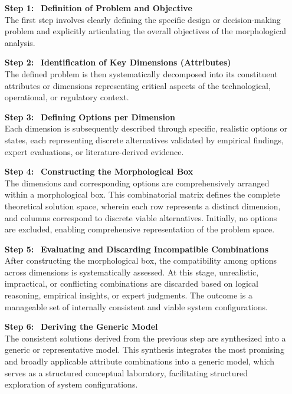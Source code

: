 \begin{enumerate}[itemsep=0.5\baselineskip]
    \item[\textbf{Step 1:}] ~\textbf{Definition of Problem and Objective}\\
    The first step involves clearly defining the specific design or decision-making problem and explicitly articulating the overall objectives of the morphological analysis. \autocite[12]{Ritchey.2011}

    \item[\textbf{Step 2:}] ~\textbf{Identification of Key Dimensions (Attributes)}\\
    The defined problem is then systematically decomposed into its constituent attributes or dimensions representing critical aspects of the technological, operational, or regulatory context. \autocite[12]{Ritchey.2011}

    \item[\textbf{Step 3:}] ~\textbf{Defining Options per Dimension}\\
    Each dimension is subsequently described through specific, realistic options or states, each representing discrete alternatives validated by empirical findings, expert evaluations, or literature-derived evidence. \autocites[][12]{Ritchey.2011}[][]{Ritchey.2015}

    \item[\textbf{Step 4:}] ~\textbf{Constructing the Morphological Box}\\
    The dimensions and corresponding options are comprehensively arranged within a morphological box. This combinatorial matrix defines the complete theoretical solution space, wherein each row represents a distinct dimension, and columns correspond to discrete viable alternatives. Initially, no options are excluded, enabling comprehensive representation of the problem space. \autocite[12]{Ritchey.2011}

    \item[\textbf{Step 5:}] ~\textbf{Evaluating and Discarding Incompatible Combinations}\\
    After constructing the morphological box, the compatibility among options across dimensions is systematically assessed. At this stage, unrealistic, impractical, or conflicting combinations are discarded based on logical reasoning, empirical insights, or expert judgments. The outcome is a manageable set of internally consistent and viable system configurations. \autocites[][13]{Ritchey.2011}[][]{Ritchey.2015}

    \item[\textbf{Step 6:}] ~\textbf{Deriving the Generic Model}\\
    The consistent solutions derived from the previous step are synthesized into a generic or representative model. This synthesis integrates the most promising and broadly applicable attribute combinations into a generic model, which serves as a structured conceptual laboratory, facilitating structured exploration of system configurations. \autocites[][14]{Ritchey.2011}[][]{Ritchey.2015}
\end{enumerate}

